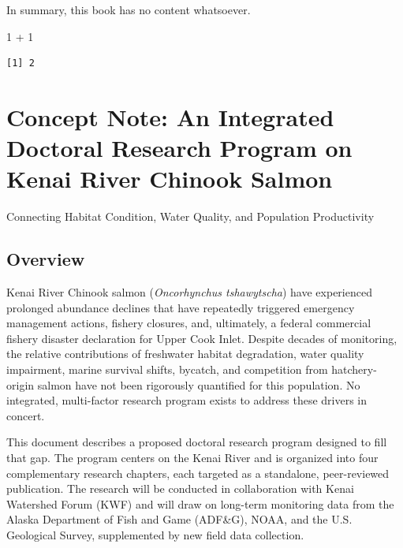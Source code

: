 \documentclass[
  letterpaper,
  DIV=11,
  numbers=noendperiod]{scrreprt}
\newenvironment{Shaded}{\begin{snugshade}}{\end{snugshade}}
\newcommand{\DecValTok}[1]{\textcolor[rgb]{0.68,0.00,0.00}{#1}}
\newcommand{\SpecialCharTok}[1]{\textcolor[rgb]{0.37,0.37,0.37}{#1}}
\begin{document}
In summary, this book has no content whatsoever.

\begin{Shaded}
\begin{Highlighting}[]
\DecValTok{1} \SpecialCharTok{+} \DecValTok{1}
\end{Highlighting}
\end{Shaded}

\begin{verbatim}
[1] 2
\end{verbatim}


\chapter{Concept Note: An Integrated Doctoral Research Program on Kenai
River Chinook
Salmon}\label{concept-note-an-integrated-doctoral-research-program-on-kenai-river-chinook-salmon}

Connecting Habitat Condition, Water Quality, and Population Productivity

\hfill\break

\section{Overview}\label{overview}

Kenai River Chinook salmon (\emph{Oncorhynchus tshawytscha}) have
experienced prolonged abundance declines that have repeatedly triggered
emergency management actions, fishery closures, and, ultimately, a
federal commercial fishery disaster declaration for Upper Cook Inlet.
Despite decades of monitoring, the relative contributions of freshwater
habitat degradation, water quality impairment, marine survival shifts,
bycatch, and competition from hatchery-origin salmon have not been
rigorously quantified for this population. No integrated, multi-factor
research program exists to address these drivers in concert.

This document describes a proposed doctoral research program designed to
fill that gap. The program centers on the Kenai River and is organized
into four complementary research chapters, each targeted as a
standalone, peer-reviewed publication. The research will be conducted in
collaboration with Kenai Watershed Forum (KWF) and will draw on
long-term monitoring data from the Alaska Department of Fish and Game
(ADF\&G), NOAA, and the U.S. Geological Survey, supplemented by new
field data collection.
\end{document}
